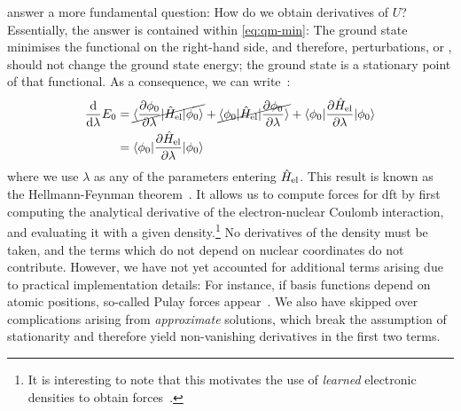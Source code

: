  answer a more fundamental question: How do we obtain derivatives of $U$?
Essentially, the answer is contained within \cref{eq:qm-min}: The ground state minimises the functional on the right-hand side, and therefore, perturbations, or , should not change the ground state energy; the ground state is a stationary point of that functional. As a consequence, we can write~\cite[ch.~3.3]{martin2020}:
\begin{align}
	\frac{\text{d}}{\text{d} \lambda} E_0 &= 
	  \cancel{\braket{\frac{\partial \phi_0}{\partial \lambda} | \hat H_{\text{el}} | \phi_0}}
	+ \cancel{\braket{\phi_0 | \hat H_{\text{el}} | \frac{\partial \phi_0}{\partial \lambda}}}
	+ \braket{\phi_0 | \frac{\partial \hat H_{\text{el}}}{\partial \lambda} | \phi_0} \\
	&=  \braket{\phi_0 | \frac{\partial \hat H_{\text{el}}}{\partial \lambda} | \phi_0} \, 
\end{align}
where we use $\lambda$ as any of the parameters entering $\hat H_{\text{el}}$. This result is known as the Hellmann-Feynman theorem~\cite{f1939p}.
It allows us to compute forces for \gls{dft} by first computing the analytical derivative of the electron-nuclear Coulomb interaction, and evaluating it with a given density.\footnote{It is interesting to note that this motivates the use of \emph{learned} electronic densities to obtain forces~\cite{p2022Aa}.} No derivatives of the density must be taken, and the terms which do not depend on nuclear coordinates do not contribute. However, we have not yet accounted for additional terms arising due to practical implementation details: For instance, if basis functions depend on atomic positions, so-called Pulay forces appear~\cite{p1969p}. We also have skipped over complications arising from \emph{approximate} solutions, which break the assumption of stationarity and therefore yield non-vanishing derivatives in the first two terms.


